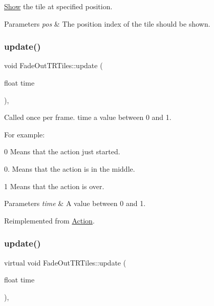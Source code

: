 \hyperlink{classShow}{Show} the tile at specified position. 


\begin{DoxyParams}{Parameters}
{\em pos} & The position index of the tile should be shown. \\
\hline
\end{DoxyParams}
\mbox{\label{classFadeOutTRTiles_a29c5392c4e1dee18689599e6a3d31671}} 
\subsubsection{\texorpdfstring{update()}{update()}\hspace{0.1cm}{\footnotesize\ttfamily [1/2]}}
{\footnotesize\ttfamily void Fade\+Out\+T\+R\+Tiles\+::update (\begin{DoxyParamCaption}\item[{float}]{time }\end{DoxyParamCaption})\hspace{0.3cm}{\ttfamily [override]}, {\ttfamily [virtual]}}

Called once per frame. time a value between 0 and 1.

For example\+:
\begin{DoxyItemize}
\item 0 Means that the action just started.
\item 0. Means that the action is in the middle.
\item 1 Means that the action is over.
\end{DoxyItemize}


\begin{DoxyParams}{Parameters}
{\em time} & A value between 0 and 1. \\
\hline
\end{DoxyParams}


Reimplemented from \hyperlink{classAction_a937e646e63915e33ad05ba149bfcf239}{Action}.

\mbox{\label{classFadeOutTRTiles_af10e18a667d01702f04bb6f0405d5228}} 
\subsubsection{\texorpdfstring{update()}{update()}\hspace{0.1cm}{\footnotesize\ttfamily [2/2]}}
{\footnotesize\ttfamily virtual void Fade\+Out\+T\+R\+Tiles\+::update (\begin{DoxyParamCaption}\item[{float}]{time }\end{DoxyParamCaption})\hspace{0.3cm}{\ttfamily [override]}, {\ttfamily [virtual]}}

